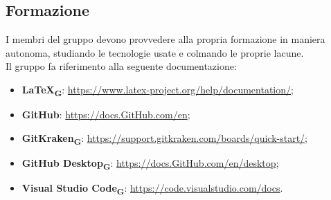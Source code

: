 \subsection{Formazione}
I membri del gruppo devono provvedere alla propria formazione in maniera autonoma, studiando le tecnologie usate e colmando le proprie lacune.\\
Il gruppo fa riferimento alla seguente documentazione:
\begin {itemize}
\item \textbf{\LaTeX\textsubscript{\textbf{G}}}: \url{https://www.latex-project.org/help/documentation/};
\item \textbf{GitHub}: \url{https://docs.GitHub.com/en};
\item \textbf{GitKraken\textsubscript{\textbf{G}}}: \url{https://support.gitkraken.com/boards/quick-start/};
\item \textbf{GitHub Desktop\textsubscript{\textbf{G}}}: \url{https://docs.GitHub.com/en/desktop};
\item \textbf{Visual Studio Code}\textsubscript{\textbf{G}}: \url{https://code.visualstudio.com/docs}.
\end {itemize}